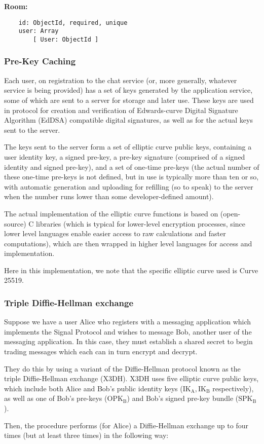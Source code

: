 \documentclass[12pt]{article}
\begin{document}
\par \textbf{Room:}
\begin{verbatim}
    id: ObjectId, required, unique
    user: Array
        [ User: ObjectId ]
\end{verbatim}

\subsubsection{Pre-Key Caching}
Each user, on registration to the chat service (or, more generally, whatever service is being provided) has a set of keys generated by the application service, some of which are sent to a server for storage and later use. These keys are used in protocol for creation and verification of Edwards-curve Digital Signature Algorithm (EdDSA) compatible digital signatures, as well as for the actual keys sent to the server. \parencite{website:sigdocXEdDSA} 
\par The keys sent to the server form a set of elliptic curve public keys, containing a user identity key, a signed pre-key, a pre-key signature (comprised of a signed identity and signed pre-key), and a set of one-time pre-keys \parencite{website:sigdocX3DH} (the actual number of these one-time pre-keys is not defined, but in use is typically more than ten or so, with automatic generation and uploading for refilling (so to speak) to the server when the number runs lower than some developer-defined amount).
\par The actual implementation of the elliptic curve functions is based on (open-source) C libraries (which is typical for lower-level encryption processes, since lower level languages enable easier access to raw calculations and faster computations), which are then wrapped in higher level languages for access and implementation. \parencite{website:prglibsigtypescriptCurve25519}\parencite{website:prglibsigtypescriptCurve25519rawC}
\par Here in this implementation, we note that the specific elliptic curve used is Curve 25519.

\subsubsection{Triple Diffie-Hellman exchange}
Suppose we have a user Alice who registers with a messaging application which implements the Signal Protocol and wishes to message Bob, another user of the messaging application. In this case, they must establish a shared secret to begin trading messages which each can in turn encrypt and decrypt. 
\par They do this by using a variant of the Diffie-Hellman protocol known as the triple Diffie-Hellman exchange (X3DH). X3DH uses five elliptic curve public keys, which include both Alice and Bob's public identity keys ($\text{IK}_\text{A}, \text{IK}_\text{B}$ respectively), as well as one of Bob's pre-keys ($\text{OPK}_\text{B}$) and Bob's signed pre-key bundle ($\text{SPK}_\text{B}$).\parencite{website:sigdocX3DH}
\par Then, the procedure performs (for Alice) a Diffie-Hellman exchange up to four times (but at least three times) in the following way: 
\end{document}
